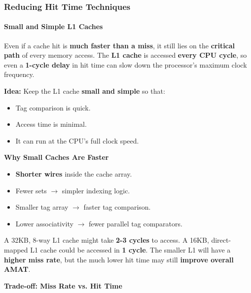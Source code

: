 \subsubsection{Reducing Hit Time Techniques}

\paragraph{Small and Simple L1 Caches}\label{paragraph: Small and Simple L1 Caches}

Even if a cache hit is \textbf{much faster than a miss}, it still lies on the \textbf{critical path} of every memory access. The \textbf{L1 cache} is accessed \textbf{every CPU cycle}, so even a \textbf{1-cycle delay} in hit time can slow down the processor's maximum clock frequency.

\highspace
\textcolor{Green3}{ \textbf{Idea:}} Keep the L1 cache \textbf{small and simple} so that:
\begin{itemize}
    \item Tag comparison is quick.
    \item Access time is minimal.
    \item It can run at the CPU's full clock speed.
\end{itemize}

\begin{flushleft}
    \textcolor{Green3}{\faIcon{\speedIcon} \textbf{Why Small Caches Are Faster}}
\end{flushleft}
\begin{itemize}
    \item \textbf{Shorter wires} inside the cache array.
    \item Fewer sets $\rightarrow$ simpler indexing logic.
    \item Smaller tag array $\rightarrow$ faster tag comparison.
    \item Lower associativity $\rightarrow$ fewer parallel tag comparators.
\end{itemize}

\begin{examplebox}
    A 32KB, 8-way L1 cache might take \textbf{2-3 cycles} to access.
    A 16KB, direct-mapped L1 cache could be accessed in \textbf{1 cycle}.
    The smaller L1 will have a \textbf{higher miss rate}, but the much lower hit time may still \textbf{improve overall AMAT}.
\end{examplebox}

\begin{flushleft}
    \textcolor{Green3}{ \textbf{Trade-off: Miss Rate vs. Hit Time}}
\end{flushleft}

